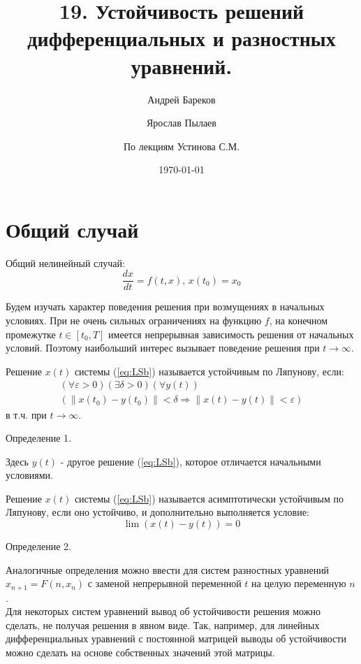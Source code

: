 \documentclass[a4paper,11pt]{article}
\title{19. Устойчивость решений дифференциальных и разностных уравнений.}
\author{Андрей Бареков \and Ярослав Пылаев \and По лекциям Устинова С.М.}
\date{\today}
\begin{document}
\maketitle
\newpage

\section{Общий случай}
\begin{importantblock}
  Общий нелинейный случай:
  \begin{equation}
    \frac{dx}{dt} = f(t, x),\, x(t_0) = x_0
    \label{eq:LSb}
  \end{equation}
\end{importantblock}
Будем изучать характер поведения решения при возмущениях в начальных условиях. При не очень сильных ограничениях на функцию $f$, на конечном промежутке
  $t \in [t_0, T]$ имеется непрерывная зависимость решения от начальных условий. Поэтому наибольший интерес вызывает поведение решения при $t \rightarrow \infty$.

\begin{importantblock}
  Решение $x(t)$ системы (\ref{eq:LSb}) называется устойчивым по Ляпунову, если:
  \begin{gather*}
    (\forall \varepsilon > 0)(\exists \delta > 0)(\forall y(t)) \\
    (\|x(t_0)-y(t_0)\| < \delta \Rightarrow \|x(t)-y(t)\| < \varepsilon)
  \end{gather*}
  в т.ч. при $t \rightarrow \infty$.
\end{importantblock}
\begin{center}
  \small{Определение 1.}
\end{center}
Здесь $y(t)$ - другое решение (\ref{eq:LSb}), которое отличается начальными условиями.
\begin{importantblock}
  Решение $x(t)$ системы (\ref{eq:LSb}) называется асимптотически устойчивым по Ляпунову, если оно устойчиво, и дополнительно выполняется условие:
  \[\lim(x(t) - y(t)) = 0\]
\end{importantblock}
\begin{center}
  \small{Определение 2.}
\end{center}
Аналогичные определения можно ввести для систем разностных уравнений \(x_{n+1} = F(n, x_n)\) с заменой непрерывной переменной $t$ на целую переменную $n$. \\
Для некоторых систем уравнений вывод об устойчивости решения можно сделать, не получая решения в явном виде. Так, например, для линейных дифференциальных уравнений
  с постоянной матрицей выводы об устойчивости можно сделать на основе собственных значений этой матрицы.
\end{document}
